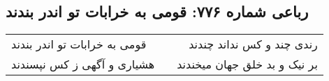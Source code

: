 \begin{center}
\section*{رباعی شماره ۷۷۶: قومی به خرابات تو اندر بندند}
\label{sec:0776}
\begin{longtable}{l p{0.5cm} r}
قومی به خرابات تو اندر بندند
&&
رندی چند و کس نداند چندند
\\
هشیاری و آگهی ز کس نپسندند
&&
بر نیک و بد خلق جهان میخندند
\\
\end{longtable}
\end{center}
